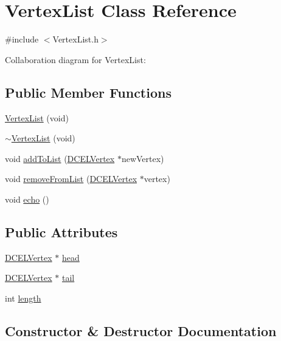 \hypertarget{classVertexList}{}\section{Vertex\+List Class Reference}
\label{classVertexList}


{\ttfamily \#include $<$Vertex\+List.\+h$>$}



Collaboration diagram for Vertex\+List\+:
\subsection*{Public Member Functions}
\begin{DoxyCompactItemize}
\item 
\hyperlink{classVertexList_a1cf46057d007f78c0bde39ab950c69d3}{Vertex\+List} (void)
\item 
\hyperlink{classVertexList_a8140e4d5af907ffe6f117bf6ea2869c4}{$\sim$\+Vertex\+List} (void)
\item 
void \hyperlink{classVertexList_abe6d4b481b752eef2eb57ec4aee23b8c}{add\+To\+List} (\hyperlink{classDCELVertex}{D\+C\+E\+L\+Vertex} $\ast$new\+Vertex)
\item 
void \hyperlink{classVertexList_adb3b006d6d94513de399e4a008805ebf}{remove\+From\+List} (\hyperlink{classDCELVertex}{D\+C\+E\+L\+Vertex} $\ast$vertex)
\item 
void \hyperlink{classVertexList_a97c3c30cd1140f6412295943ad075fec}{echo} ()
\end{DoxyCompactItemize}
\subsection*{Public Attributes}
\begin{DoxyCompactItemize}
\item 
\hyperlink{classDCELVertex}{D\+C\+E\+L\+Vertex} $\ast$ \hyperlink{classVertexList_a1816fa2e1ce89953d2ec57b19f25c45a}{head}
\item 
\hyperlink{classDCELVertex}{D\+C\+E\+L\+Vertex} $\ast$ \hyperlink{classVertexList_abe95a569380189ea9552c8eb4c927d7d}{tail}
\item 
int \hyperlink{classVertexList_a99fe4395d1c973a38e5e830909175f34}{length}
\end{DoxyCompactItemize}


\subsection{Constructor \& Destructor Documentation}
